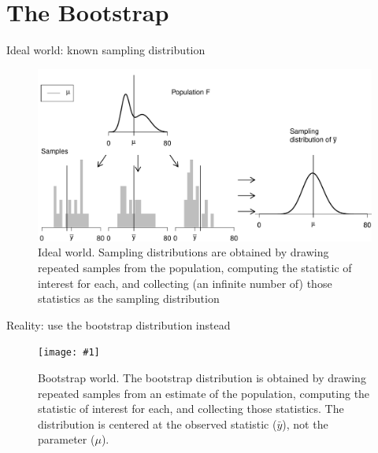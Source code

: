 \documentclass{beamer}\usepackage[]{graphicx}\usepackage[]{color}
\newenvironment{knitrout}{}{} %
\newcommand {\framedgraphiccaption}[2] {
	\begin{figure}
		\centering
		\texttt{[image: \#1]}
		\caption{#2}
	\end{figure}
}
\begin{document}
\section{The Bootstrap}


\begin{frame}[fragile]{Ideal world: known sampling distribution}

\begin{knitrout}\scriptsize
{}\color{fgcolor}\begin{figure}

{\centering \includegraphics[width=1\linewidth]{figure/unnamed-chunk-7-1} 

}

\caption{\scriptsize{Ideal world. Sampling distributions are obtained by drawing repeated samples from the population, computing the statistic of interest for each, and collecting (an infinite number of) those statistics as the sampling distribution}}\label{fig:unnamed-chunk-7}
\end{figure}


\end{knitrout}

\end{frame}



\begin{frame}[fragile]{Reality: use the bootstrap distribution instead}




\framedgraphiccaption{boot_diag.pdf}{\scriptsize{Bootstrap world. The bootstrap distribution is obtained by drawing repeated samples from an estimate of the population, computing the statistic of interest for each, and collecting those statistics. The distribution is centered at the observed statistic ($\bar{y}$), not the parameter ($\mu$).}}

\end{frame}
\end{document}
